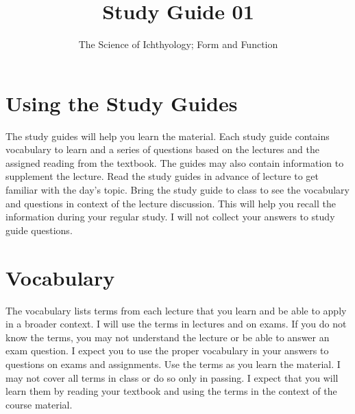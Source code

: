 \documentclass[nofonts, letterpaper]{tufte-handout}
\title{Study Guide 01}
\author{The Science of Ichthyology; Form and Function}
\date{} %
\begin{document}
\maketitle	%


\section{Using the Study Guides}
The study guides will help you learn the material.  Each study guide contains vocabulary to learn and a series of questions based on the lectures and the assigned reading from the textbook.  The guides may also contain information to supplement the lecture.  Read the study guides in advance of lecture to get familiar with the day's topic. Bring the study guide to class to see the vocabulary and questions in context of the lecture discussion.  This will help you recall the information during your regular study. I will not collect your answers to study guide questions.

\section{Vocabulary}
The vocabulary lists terms from each lecture that you learn and be able to apply in a broader context.  I will use the terms in lectures and on exams. If you do not know the terms, you may not understand the lecture or be able to answer an exam question. I expect you to use the proper vocabulary in your answers to questions on exams and assignments.  Use the terms as you learn the material.  I may not cover all terms in class or do so only in passing.  I expect that you will learn them by reading your textbook and using the terms in the context of the course material.
\end{document}
